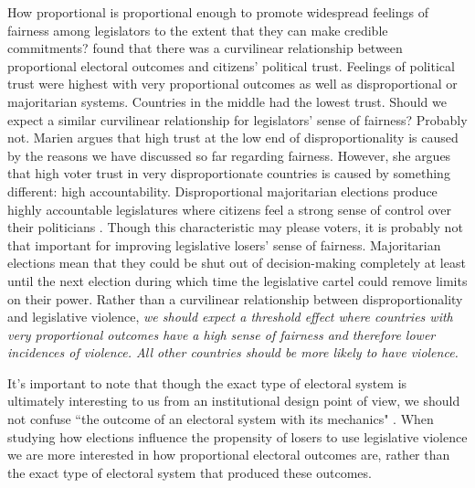\documentclass[a4paper]{article}\usepackage[]{graphicx}\usepackage[]{color}
\begin{document}
How proportional is proportional enough to promote widespread feelings of fairness among legislators to the extent that they can make credible commitments? \cite{Marien2011} found that there was a curvilinear relationship between proportional electoral outcomes and citizens' political trust. Feelings of political trust were highest with very proportional outcomes as well as disproportional or majoritarian systems. Countries in the middle had the lowest trust. Should we expect a similar curvilinear relationship for legislators' sense of fairness? Probably not. Marien argues that high trust at the low end of disproportionality is caused by the reasons we have discussed so far regarding fairness. However, she argues that high voter trust in very disproportionate countries is caused by something different: high accountability. Disproportional majoritarian elections produce highly accountable legislatures where citizens feel a strong sense of control over their politicians \citep{Aarts2008,CHO2012}. Though this characteristic may please voters, it is probably not that important for improving legislative losers' sense of fairness. Majoritarian elections mean that they could be shut out of decision-making completely at least until the next election during which time the legislative cartel could remove limits on their power. Rather than a curvilinear relationship between disproportionality and legislative violence, \emph{we should expect a threshold effect where countries with very proportional outcomes have a high sense of fairness and therefore lower incidences of violence. All other countries should be more likely to have violence.} 

It's important to note that though the exact type of electoral system is ultimately interesting to us from an institutional design point of view, we should not confuse ``the outcome of an electoral system with its mechanics" \citep[][109]{Golder2005}. When studying how elections influence the propensity of losers to use legislative violence we are more interested in how proportional electoral outcomes are, rather than the exact type of electoral system that produced these outcomes. 
\end{document}

